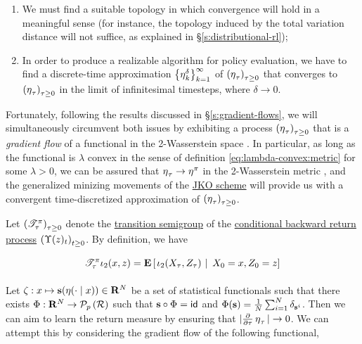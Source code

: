 \begin{enumerate}
\item We must find a suitable topology in which convergence will hold in a
  meaningful sense (for instance, the topology induced by the total variation
  distance will not suffice, as explained in \S\ref{s:distributional-rl});
\item In order to produce a realizable algorithm for policy evaluation, we have
  to find a discrete-time approximation $\indexedint{k}{\infty}{\returnmeasure^\delta}$
  of $\indexedabove{\tau}{\returnmeasure}$
  that converges to $\indexedabove{\tau}{\returnmeasure}$ in the limit of
  infinitesimal timesteps, where $\delta\to 0$. 
\end{enumerate}

Fortunately, following the results discussed in \S\ref{s:gradient-flows}, we
will simultaneously circumvent both issues by exhibiting a process
$\indexedabove{\tau}{\returnmeasure}$ that is a \emph{gradient flow} of a
functional in the 2-Wasserstein space \citep{ambrosio2008gradient}. In
particular, as long as the functional is $\lambda$ convex in the sense of
definition \ref{eq:lambda-convex:metric}
for some $\lambda>0$, we can be assured that
$\returnmeasure_\tau\to\returnmeasure^\pi$ in the 2-Wasserstein metric
\citep{Jordan02thevariational, santambrogio2015optimal}, and the generalized
minizing movements of the \hyperref[s:gradient-flows:wgf]{JKO scheme} will
provide us with a convergent time-discretized approximation of
$\indexedabove{\tau}{\returnmeasure}$.

Let $\indexedabove{\tau}{\bellmanoperator}$ denote the
\hyperref[def:transition-semigroup]{transition semigroup} of the
\hyperref[def:conditional-backward-return]{conditional backward return process}
$\indexedabove{t}{\cbrprocess(z)}$.
By definition, we have

\begin{align*}
  \bellmanoperator_\tau\proj{2}(x, z) &=
                                        \ConditionExpect{\proj{2}(X_\tau,
                                        Z_\tau)}{X_0=x, Z_0 = z}\\
\end{align*}

Let $\statistics:x\mapsto\mathbf{s}(\returnmeasure(\cdot\mid
x))\in\mathbf{R}^N$ be a set of statistical functionals such that
there exists $\Phi:\mathbf{R}^N\to\probset{\returnspace}$ such that
$\mathbf{s}\circ\Phi=\identity$ and $\Phi(\mathbf{s}) =
\frac{1}{N}\sum_{i=1}^N\dirac{\mathbf{s}^i}$. Then we can aim to
learn the return measure by ensuring that
$|\partialderiv{}{\tau}\returnmeasure_\tau|\to 0$. We can attempt this by
considering the gradient flow of the following functional,

